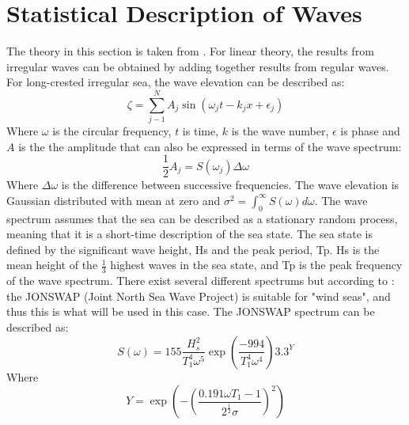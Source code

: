 \section{Statistical Description of Waves} 
 The theory in this section is taken from \cite{Faltinsen1990}. For linear theory, the results from irregular waves can be obtained by adding together results from regular waves. For long-crested irregular sea, the wave elevation can be described as:
\begin{equation}
    \zeta = \sum_{j-1}^N A_j \sin(\omega_jt-k_jx+\epsilon_j)
    \label{eq:elevation}
\end{equation}
Where $\omega$ is the circular frequency, $t$ is time, $k$ is the wave number, $\epsilon$ is phase and $A$ is the the amplitude that can also be expressed in terms of the wave spectrum:
\begin{equation}
    \frac{1}{2}A_j=S(\omega_j) \Delta \omega
\end{equation}
Where $\Delta \omega$ is the difference between successive frequencies. The wave elevation is Gaussian distributed with mean at zero and $\sigma^2= \int_0 ^ \infty S(\omega) d\omega $. The wave spectrum assumes that the sea can be described as a stationary random process, meaning that it is a short-time description of the sea state. The sea state is defined by the significant wave height, Hs and the peak period, Tp. Hs is the mean height of the $\frac{1}{3}$ highest waves in the sea state, and Tp is the peak frequency of the wave spectrum. There exist several different spectrums but according to \cite{Lifes50+D1.1}: the JONSWAP (Joint North Sea Wave Project) is suitable for "wind seas", and thus this is what will be used in this case. The JONSWAP spectrum can be described as:
\begin{equation}
    S(\omega)=155 \frac{H_s^2}{T_1^4 \omega ^5} \exp{(\frac{-994}{T_1^4 \omega ^4})} 3.3^Y
\end{equation}
Where
\begin{equation}
    Y= \exp \left(-\left( \frac{0.191 \omega T_1 -1}{2^\frac{1}{2} \sigma} \right)^2\right)
\end{equation}

